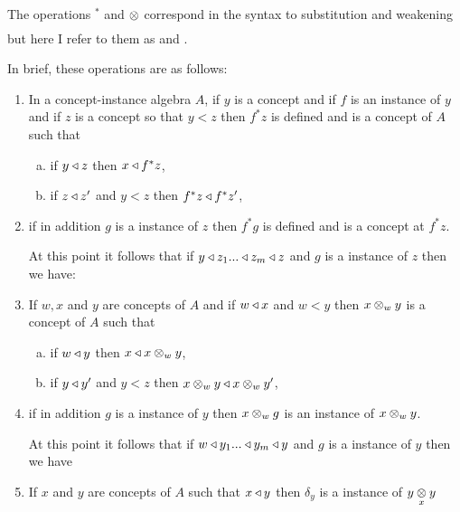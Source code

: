 \documentclass[10pt,a4paper]{article}
\begin{document}
\vspace{1cm}
The  operations $^*$ and $\crossx{}{}{}$  
 correspond in the syntax to  substitution and  weakening but here I refer to them as  and 
 .

In brief, these operations are as follows:

\begin{enumerate}
\item In a concept-instance algebra $A$, if $y$ is a concept and if $f$ is an instance of $y$
 and if $z$ is a concept so that $y < z$ then $f^*z$ is defined and is a concept of $A$ 
      such that 
			\begin{enumerate}[(a)]
			\item if $y \base z$ then $x \base f^*z$,
			\item if $z \base z'$ and $y <z$ then $f^*z \base f^*z'$,
			\end{enumerate}
\setcounter{levelofdetail}{1} %

\item if in addition $g$ is a instance of $z$ then $f^*g$ is defined and is a concept at $f^*z$. 
\setcounter{levelofdetail}{3} %



At this point it follows that if $y \base z_1 ... \base z_m \base z$ and $g$ is a instance of $z$ then we have:

 

\item If $w,x$ and $y$ are concepts of $A$  and if $w \base x$ and $w < y$ then $x \cross_w y$ is a concept of $A$ 
such that
    \begin{enumerate}[(a)]
		\item if $w \base y$ then $x \base x \cross_w y$,
		\item if $y \base y'$ and $y <z$ then $x \cross_w y \base x \cross_w y'$,
		\end{enumerate}
\item if in addition $g$ is a instance of $y$ then $x \cross_w g$ is an instance of $x \cross_w y$.

At this point it follows that if $w \base y_1 ... \base y_m \base y$ and $g$ is a instance of $y$ then we have

\vspace{0.5cm}
\item If $x$ and $y$ are concepts of $A$ such that $x \base y$ then $\delta_y$ is a instance of $\crossx{y}{y}{x}$
\vspace{0.5cm}
 
\end{enumerate}
\end{document}

